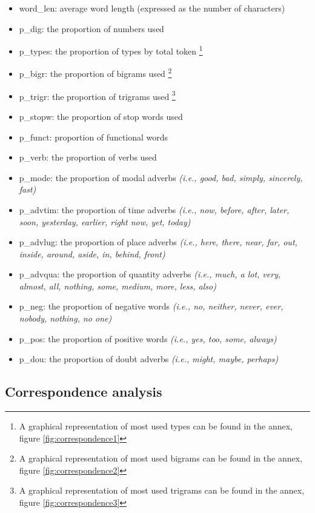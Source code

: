 \documentclass[
  12pt,
]{article}
\providecommand{\tightlist}{%
  \setlength{\itemsep}{0pt}\setlength{\parskip}{0pt}}
\begin{document}
\begin{itemize}
\tightlist
\item
  word\_len: average word length (expressed as the number of characters)
\item
  p\_dig: the proportion of numbers used
\item
  p\_types: the proportion of types by total token \footnote{A graphical representation of most used types can be found in the annex, figure \ref{fig:correspondence1}}
\item
  p\_bigr: the proportion of bigrams used \footnote{A graphical representation of most used bigrams can be found in the annex, figure \ref{fig:correspondence2}}
\item
  p\_trigr: the proportion of trigrams used \footnote{A graphical representation of most used trigrams can be found in the annex, figure \ref{fig:correspondence3}}
\item
  p\_stopw: the proportion of stop words used
\item
  p\_funct: proportion of functional words
\item
  p\_verb: the proportion of verbs used
\item
  p\_mode: the proportion of modal adverbs \emph{(i.e., good, bad, simply, sincerely, fast)}
\item
  p\_advtim: the proportion of time adverbs \emph{(i.e., now, before, after, later, soon, yesterday, earlier, right now, yet, today)}
\item
  p\_advlug: the proportion of place adverbs \emph{(i.e., here, there, near, far, out, inside, around, aside, in, behind, front)}
\item
  p\_advqua: the proportion of quantity adverbs \emph{(i.e., much, a lot, very, almost, all, nothing, some, medium, more, less, also)}
\item
  p\_neg: the proportion of negative words \emph{(i.e., no, neither, never, ever, nobody, nothing, no one)}
\item
  p\_pos: the proportion of positive words \emph{(i.e., yes, too, some, always)}
\item
  p\_dou: the proportion of doubt adverbs \emph{(i.e., might, maybe, perhaps)}
\end{itemize}

\hypertarget{correspondence-analysis}{%
\subsection{Correspondence analysis}\label{correspondence-analysis}}
\end{document}
